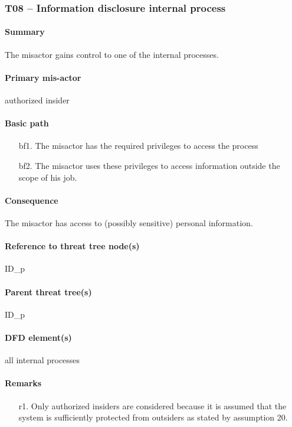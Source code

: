\subsubsection{T08 -- Information disclosure internal process}

\paragraph{Summary} The misactor gains control to one of the internal processes.

\paragraph{Primary mis-actor} authorized insider

\paragraph{Basic path}
\begin{enumerate}
	\item[bf1.] The misactor has the required privileges to access the process
	\item[bf2.] The misactor uses these privileges to access information outside
	the scope of his job.
\end{enumerate}

\paragraph{Consequence} The misactor has access to (possibly sensitive)
personal information.

\paragraph{Reference to threat tree node(s)} ID\_p

\paragraph{Parent threat tree(s)} ID\_p

\paragraph{DFD element(s)} all internal processes

\paragraph{Remarks}
\begin{enumerate}
     \item[r1.] Only authorized insiders are considered because it is assumed
     that the system is sufficiently protected from outsiders as stated by
     assumption 20.
\end{enumerate}
